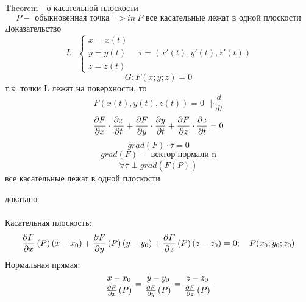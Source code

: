 \documentclass{article}
\begin{document}
Theorem  - о касательной плоскости 
\begin{equation*}
    P - \text{ обыкновенная точка =>}\ in\ P \text{ все касательные лежат в одной плоскости}
\end{equation*}
Доказательство
\begin{equation*}
    L:\ 
    \begin{cases}
        x = x(t)\\
        y = y(t)\\
        z = z(t)
    \end{cases} \ \ \ \ 
    \overline{\tau} = (x'(t), y'(t), z'(t))
\end{equation*}
\begin{equation*}
    G: F(x;y;z) = 0
\end{equation*}
т.к. точки L лежат на поверхности, то 
\begin{equation*}
    F(x(t), y(t), z(t)) = 0\ \ \ | \cdot \frac{d}{dt}
\end{equation*}
\begin{equation*}
    \pdv{F}{x}\cdot \pdv{x}{t} + \pdv{F}{y}\cdot \pdv{y}{t} + \pdv{F}{z}\cdot \pdv{z}{t} = 0
\end{equation*}
\begin{equation*}
    grad(F)\cdot \overline{\tau} = 0
\end{equation*}
\begin{equation*}
    grad(F) - \text{ вектор нормали n}
\end{equation*}
\begin{equation*}
    \forall \overline{\tau} \perp grad(\overline{F}(P))
\end{equation*}
все касательные лежат в одной плоскости 

доказано
\\  \\
Касательная плоскость:
\begin{equation*}
    \pdv{F}{x}\left(P\right)(x-x_0)+\pdv{F}{y}\left(P\right)(y - y_0) +\pdv{F}{z}\left(P\right)(z - z_0) = 0; \ \ \  P(x_0;y_0;z_0)
\end{equation*}
Нормальная прямая:
\begin{equation*}
    \frac{x-x_0}{\pdv{F}{x}\left(P\right)} = \frac{y-y_0}{\pdv{F}{y}\left(P\right)} = \frac{z-z_0}{\pdv{F}{z}\left(P\right)}
\end{equation*}
\end{document}
